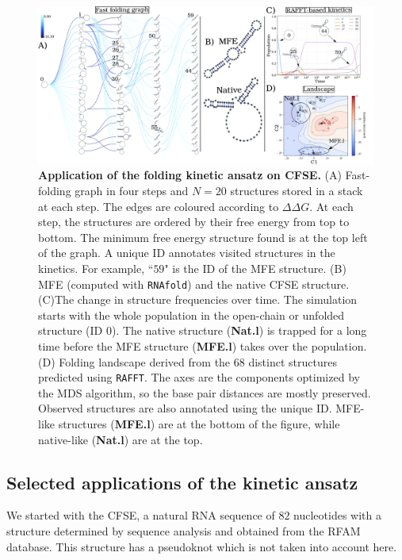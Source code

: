 \begin{figure}[t!]
	\centering
	\includegraphics[width=0.9\linewidth]{../res/images/rafft/test_case.png}
	\caption{\label{test_case}\textbf{Application of the folding kinetic ansatz on CFSE.}  (A) Fast-folding graph in four steps and $N=20$ structures stored in a stack at each step. The edges are coloured according to \(\Delta \Delta G\). At each step, the structures are ordered by their free energy from top to bottom. The minimum free energy structure found is at the top left of the graph. A unique ID annotates visited structures in the kinetics. For example, ``$59$" is the ID of the MFE structure. (B) MFE (computed with \texttt{RNAfold}) and the native CFSE structure. (C)The change in structure frequencies over time. The simulation starts with the whole population in the open-chain or unfolded structure (ID 0). The native structure (\textbf{Nat.l}) is trapped for a long time before the MFE structure (\textbf{MFE.l}) takes over the population. (D) Folding landscape derived from the $68$ distinct structures predicted using \texttt{RAFFT}. The axes are the components optimized by the MDS algorithm, so the base pair distances are mostly preserved. Observed structures are also annotated using the unique ID. MFE-like structures (\textbf{MFE.l}) are at the bottom of the figure, while native-like (\textbf{Nat.l}) are at the top.}
\end{figure}
\subsection*{Selected applications of the kinetic ansatz}
We started with the CFSE, a natural RNA sequence of $82$ nucleotides with a structure determined by sequence analysis and obtained from the RFAM database. This structure has a pseudoknot which is not taken into account here.

